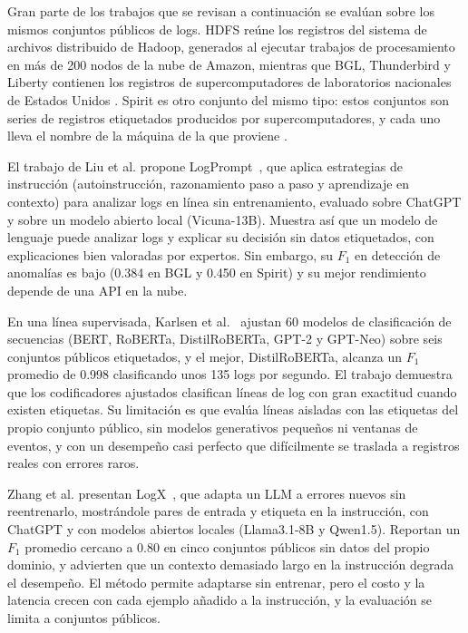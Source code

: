 Gran parte de los trabajos que se revisan a continuación se evalúan sobre los mismos conjuntos públicos de logs. HDFS reúne los registros del sistema de archivos distribuido de Hadoop, generados al ejecutar trabajos de procesamiento en más de 200 nodos de la nube de Amazon, mientras que BGL, Thunderbird y Liberty contienen los registros de supercomputadores de laboratorios nacionales de Estados Unidos \cite{guan2024_logllm}. Spirit es otro conjunto del mismo tipo: estos conjuntos son series de registros etiquetados producidos por supercomputadores, y cada uno lleva el nombre de la máquina de la que proviene \cite{karlsen2024_benchmark}.

El trabajo de Liu et al. propone LogPrompt~\cite{liu2024_logprompt}, que aplica estrategias de instrucción (autoinstrucción, razonamiento paso a paso y aprendizaje en contexto) para analizar logs en línea sin entrenamiento, evaluado sobre ChatGPT y sobre un modelo abierto local (Vicuna-13B). Muestra así que un modelo de lenguaje puede analizar logs y explicar su decisión sin datos etiquetados, con explicaciones bien valoradas por expertos. Sin embargo, su $F_1$ en detección de anomalías es bajo (0.384 en BGL y 0.450 en Spirit) y su mejor rendimiento depende de una API en la nube.

En una línea supervisada, Karlsen et al.~\cite{karlsen2024_benchmark} ajustan 60 modelos de clasificación de secuencias (BERT, RoBERTa, DistilRoBERTa, GPT-2 y GPT-Neo) sobre seis conjuntos públicos etiquetados, y el mejor, DistilRoBERTa, alcanza un $F_1$ promedio de 0.998 clasificando unos 135 logs por segundo. El trabajo demuestra que los codificadores ajustados clasifican líneas de log con gran exactitud cuando existen etiquetas. Su limitación es que evalúa líneas aisladas con las etiquetas del propio conjunto público, sin modelos generativos pequeños ni ventanas de eventos, y con un desempeño casi perfecto que difícilmente se traslada a registros reales con errores raros.

Zhang et al. presentan LogX~\cite{zhang2024_logx}, que adapta un LLM a errores nuevos sin reentrenarlo, mostrándole pares de entrada y etiqueta en la instrucción, con ChatGPT y con modelos abiertos locales (Llama3.1-8B y Qwen1.5). Reportan un $F_1$ promedio cercano a 0.80 en cinco conjuntos públicos sin datos del propio dominio, y advierten que un contexto demasiado largo en la instrucción degrada el desempeño. El método permite adaptarse sin entrenar, pero el costo y la latencia crecen con cada ejemplo añadido a la instrucción, y la evaluación se limita a conjuntos públicos.

